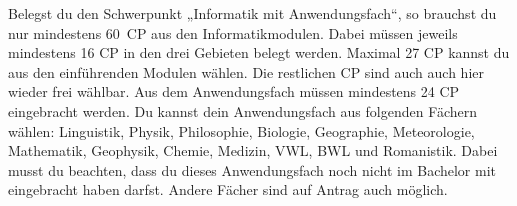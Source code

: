 Belegst du den Schwerpunkt „Informatik mit Anwendungsfach“, so brauchst du nur mindestens 60~CP aus den Informatikmodulen. Dabei müssen jeweils mindestens 16 CP in den drei Gebieten belegt werden. Maximal 27 CP kannst du aus den einführenden Modulen wählen. Die restlichen CP sind auch auch hier wieder frei wählbar. Aus dem Anwendungsfach müssen mindestens 24 CP eingebracht werden. Du kannst dein Anwendungsfach aus folgenden Fächern wählen: Linguistik, Physik, Philosophie, Biologie, Geographie, Meteorologie, Mathematik, Geophysik, Chemie, Medizin, VWL, BWL und Romanistik. Dabei musst du beachten, dass du dieses Anwendungsfach noch nicht im Bachelor mit eingebracht haben darfst. Andere Fächer sind auf Antrag auch möglich.

